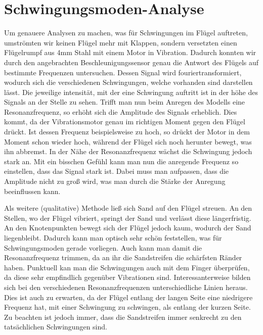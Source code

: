 \documentclass[12pt,a4paper,titlepage,headinclude,bibtotoc]{scrartcl}
\begin{document}
\section{Schwingungsmoden-Analyse}
Um genauere Analysen zu machen, was für Schwingungen im Flügel auftreten, umströmten wir keinen Flügel mehr mit Klappen, sondern versetzten einen Flügelrumpf aus 4mm Stahl mit einem Motor in Vibration.
Dadurch konnten wir durch den angebrachten Beschleunigungssensor genau die Antwort des Flügels auf bestimmte Frequenzen untersuchen.
Dessen Signal wird fouriertransformiert, wodurch sich die verschiedenen Schwingungen, welche vorhanden sind darstellen lässt.
Die jeweilige intensität, mit der eine Schwingung auftritt ist in der höhe des Signals an der Stelle zu sehen.
Trifft man nun beim Anregen des Modells eine Resonanzfrequenz, so erhöht sich die Amplitude des Signals erheblich.
Dies kommt, da der Vibrationsmotor genau im richtigen Moment gegen den Flügel drückt.
Ist dessen Frequenz beispielsweise zu hoch, so drückt der Motor in dem Moment schon wieder hoch, während der Flügel sich noch herunter bewegt, was ihn abbremst.
In der Nähe der Resonanzfrequenz wächst die Schwingung jedoch stark an.
Mit ein bisschen Gefühl kann man nun die anregende Frequenz so einstellen, dass das Signal stark ist.
Dabei muss man aufpassen, dass die Amplitude nicht zu groß wird, was man durch die Stärke der Anregung beeinflussen kann.\newline\newline

Als weitere (qualitative) Methode ließ sich Sand auf den Flügel streuen.
An den Stellen, wo der Flügel vibriert, springt der Sand und verlässt diese längerfristig.
An den Knotenpunkten bewegt sich der Flügel jedoch kaum, wodurch der Sand liegenbleibt.
Dadurch kann man optisch sehr schön feststellen, was für Schwingungsmoden gerade vorliegen.
Auch kann man damit die Resonanzfrequenz trimmen, da an ihr die Sandstreifen die schärfsten Ränder haben.
Punktuell kan man die Schwingungen auch mit dem Finger überprüfen, da diese sehr empfindlich gegenüber Vibrationen sind.
Interessanterweise bilden sich bei den verschiedenen Resonanzfrequenzen unterschiedliche Linien heraus.
Dies ist auch zu erwarten, da der Flügel entlang der langen Seite eine niedrigere Frequenz hat, mit einer Schwingung zu schwingen, als entlang der kurzen Seite.
Zu beachten ist jedoch immer, dass die Sandstreifen immer senkrecht zu den tatsächlichen Schwingungen sind.
\newpage
\end{document}
